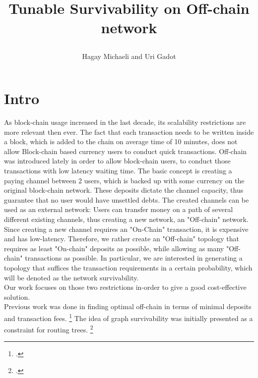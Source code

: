 \documentclass{cup-ino}
\title{\item Tunable Survivability on Off-chain network}
\author{Hagay Michaeli and Uri Gadot}
\begin{document}
\maketitle


\section{Intro}
As block-chain usage increased in the last decade, its scalability restrictions are more relevant then ever. The fact that each transaction needs to be written inside a block, which is added to the chain on average time of 10 minutes, does not allow Block-chain based currency users to conduct quick transactions. Off-chain was introduced lately in order to allow block-chain users, to conduct those transactions with low latency waiting time.
The basic concept is creating a paying channel between 2 users, which is backed up with some currency on the original block-chain network. These deposits dictate the channel capacity, thus guarantee that no user would have unsettled debts.
The created channels can be used as an external network:
Users can transfer money on a path of several different existing channels, thus creating a new network, an "Off-chain" network.\\
Since creating a new channel requires an "On-Chain" transaction, it is expensive and has low-latency. Therefore, we rather create an "Off-chain" topology that requires as least "On-chain" deposits as possible, while allowing as many "Off-chain" transactions as possible. In particular, we are interested in generating a topology that suffices the transaction requirements in a certain probability, which will be denoted as the network survivability.  \\
Our work focuses on those two restrictions in-order to give a good cost-effective solution.\\
Previous work was done in finding optimal off-chain in terms of minimal deposits and transaction fees. \footcite{9352899}
The idea of graph survivability was initially presented as a constraint for routing trees. \footcite{7163640}
\end{document}
